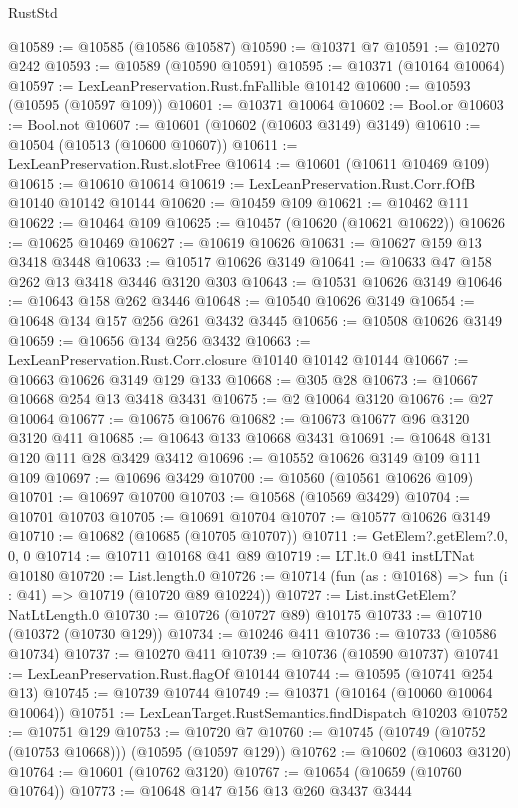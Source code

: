\begin{lexlean}{RustStd}
\begin{coremodule}
@10589 := @10585 (@10586 @10587)
@10590 := @10371 @7
@10591 := @10270 @242
@10593 := @10589 (@10590 @10591)
@10595 := @10371 (@10164 @10064)
@10597 := LexLeanPreservation.Rust.fnFallible @10142
@10600 := @10593 (@10595 (@10597 @109))
@10601 := @10371 @10064
@10602 := Bool.or
@10603 := Bool.not
@10607 := @10601 (@10602 (@10603 @3149) @3149)
@10610 := @10504 (@10513 (@10600 @10607))
@10611 := LexLeanPreservation.Rust.slotFree
@10614 := @10601 (@10611 @10469 @109)
@10615 := @10610 @10614
@10619 := LexLeanPreservation.Rust.Corr.fOfB @10140 @10142 @10144
@10620 := @10459 @109
@10621 := @10462 @111
@10622 := @10464 @109
@10625 := @10457 (@10620 (@10621 @10622))
@10626 := @10625 @10469
@10627 := @10619 @10626
@10631 := @10627 @159 @13 @3418 @3448
@10633 := @10517 @10626 @3149
@10641 := @10633 @47 @158 @262 @13 @3418 @3446 @3120 @303
@10643 := @10531 @10626 @3149
@10646 := @10643 @158 @262 @3446
@10648 := @10540 @10626 @3149
@10654 := @10648 @134 @157 @256 @261 @3432 @3445
@10656 := @10508 @10626 @3149
@10659 := @10656 @134 @256 @3432
@10663 := LexLeanPreservation.Rust.Corr.closure @10140 @10142 @10144
@10667 := @10663 @10626 @3149 @129 @133
@10668 := @305 @28
@10673 := @10667 @10668 @254 @13 @3418 @3431
@10675 := @2 @10064 @3120
@10676 := @27 @10064
@10677 := @10675 @10676
@10682 := @10673 @10677 @96 @3120 @3120 @411
@10685 := @10643 @133 @10668 @3431
@10691 := @10648 @131 @120 @111 @28 @3429 @3412
@10696 := @10552 @10626 @3149 @109 @111 @109
@10697 := @10696 @3429
@10700 := @10560 (@10561 @10626 @109)
@10701 := @10697 @10700
@10703 := @10568 (@10569 @3429)
@10704 := @10701 @10703
@10705 := @10691 @10704
@10707 := @10577 @10626 @3149
@10710 := @10682 (@10685 (@10705 @10707))
@10711 := GetElem?.getElem?.{0, 0, 0}
@10714 := @10711 @10168 @41 @89
@10719 := LT.lt.{0} @41 instLTNat @10180
@10720 := List.length.{0}
@10726 := @10714 (fun (as : @10168) => fun (i : @41) => @10719 (@10720 @89 @10224))
@10727 := List.instGetElem?NatLtLength.{0}
@10730 := @10726 (@10727 @89) @10175
@10733 := @10710 (@10372 (@10730 @129))
@10734 := @10246 @411
@10736 := @10733 (@10586 @10734)
@10737 := @10270 @411
@10739 := @10736 (@10590 @10737)
@10741 := LexLeanPreservation.Rust.flagOf @10144
@10744 := @10595 (@10741 @254 @13)
@10745 := @10739 @10744
@10749 := @10371 (@10164 (@10060 @10064 @10064))
@10751 := LexLeanTarget.RustSemantics.findDispatch @10203
@10752 := @10751 @129
@10753 := @10720 @7
@10760 := @10745 (@10749 (@10752 (@10753 @10668))) (@10595 (@10597 @129))
@10762 := @10602 (@10603 @3120)
@10764 := @10601 (@10762 @3120)
@10767 := @10654 (@10659 (@10760 @10764))
@10773 := @10648 @147 @156 @13 @260 @3437 @3444

\end{coremodule}
\end{lexlean}

